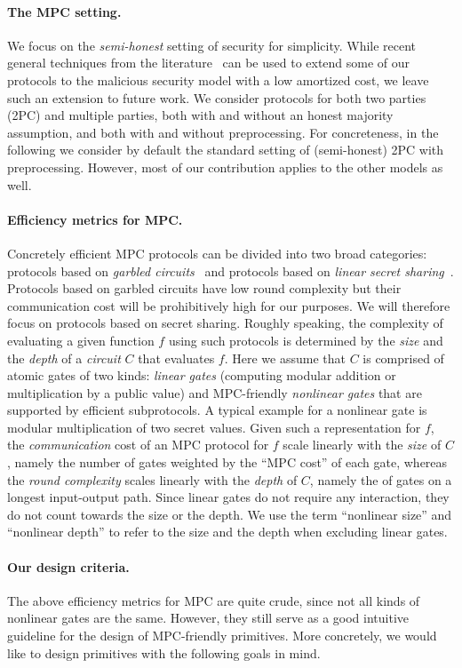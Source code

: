 \paragraph{The MPC setting.} We focus on the {\em semi-honest} setting of security for simplicity. While recent general techniques from the literature~\cite{BBCGI19,BGIN19} can be used to extend some of our protocols to the malicious security model with a low amortized cost, we leave such an extension to future work. We consider protocols for both two parties (2PC) and multiple parties, both with and without an honest majority assumption, and both with and without preprocessing. For concreteness, in the following we consider by default the standard setting of (semi-honest) 2PC with preprocessing. However, most of our contribution applies to the other models as well. 

\paragraph{Efficiency metrics for MPC.}   Concretely efficient MPC protocols can be divided into two broad categories: protocols based on {\em garbled circuits}~\cite{Yao} and protocols based on {\em linear secret sharing}~\cite{GMW,BGW,CCD}. Protocols based on garbled circuits have low round complexity but their communication cost will be prohibitively high for our purposes. We will therefore focus on protocols based on secret sharing. Roughly speaking, the complexity of evaluating  a given function $f$ using such protocols is determined by the {\em size} and the {\em depth} of a {\em circuit} $C$ that evaluates $f$.  Here we assume that $C$ is comprised of atomic gates of two kinds: {\em linear gates} (computing modular addition or multiplication by a public value) and MPC-friendly {\em nonlinear gates}  that are supported by efficient subprotocols. A typical example for a nonlinear gate is modular multiplication of two secret values. Given such a representation for $f$, the {\em communication} cost of an MPC protocol for $f$ scale linearly with the {\em size} of $C$, namely the number of gates weighted by the ``MPC cost'' of each gate, whereas the {\em round complexity} scales linearly with the {\em depth} of $C$, namely the of gates on a longest input-output path. Since linear gates do not require any interaction, they do not count towards the size or the depth. We use the term ``nonlinear size'' and ``nonlinear depth'' to refer to the size and the depth when excluding linear gates. 

\paragraph{Our design criteria.}  The above efficiency metrics for MPC are quite crude, since not all kinds of nonlinear gates are the same. However, they still serve as a good intuitive guideline for the design of MPC-friendly primitives. More concretely, we would like to design primitives with the following goals in mind.

